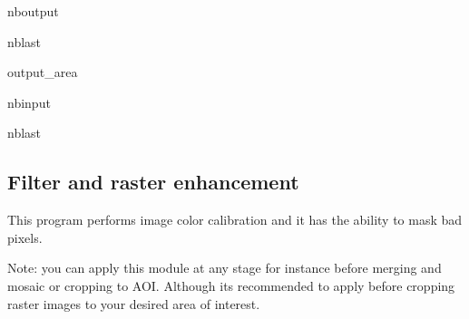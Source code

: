 \documentclass[letterpaper,10pt]{sphinxmanual}
\begin{document}
\begin{sphinxuseclass}{nboutput}
\begin{sphinxuseclass}{nblast}
{\begin{sphinxuseclass}{output_area}
\begin{sphinxuseclass}{}
\end{sphinxuseclass}
\end{sphinxuseclass}
}

\end{sphinxuseclass}
\end{sphinxuseclass}
\begin{sphinxuseclass}{nbinput}
\begin{sphinxuseclass}{nblast}
{
\begin{sphinxVerbatim}[commandchars=\\\{\}]
\llap{\color{nbsphinxin}[ ]:\,\hspace{\fboxrule}\hspace{\fboxsep}}
\end{sphinxVerbatim}
}

\end{sphinxuseclass}
\end{sphinxuseclass}


\sphinxstepscope


\subsection{Filter and raster enhancement}
\label{\detokenize{notebooks/Filter_PreProcess:filter-and-raster-enhancement}}\label{\detokenize{notebooks/Filter_PreProcess::doc}}
\sphinxAtStartPar
This program performs image color calibration and it has the ability to mask bad pixels.

\sphinxAtStartPar
{}

\begin{sphinxVerbatim}[commandchars=\\\{\}]
 
   

\end{sphinxVerbatim}

\sphinxAtStartPar
{}

\sphinxAtStartPar
Note: you can apply this module at any stage for instance before merging and mosaic or cropping to AOI. Although its recommended to apply before cropping raster images to your desired area of interest.
\end{document}
